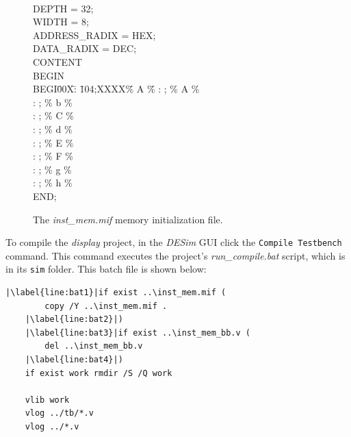 \documentclass[epsfig,10pt,fullpage]{article} \addtolength{\textwidth}{1.5in}
\begin{document}
~\\
\begin{figure}[bh!]
\begin{center}
\begin{minipage}[t]{12.5 cm}
\begin{tabbing}
DEPTH = 32;\\
WIDTH = 8;\\
ADDRESS\_RADIX = HEX;\\
DATA\_RADIX = DEC;\\
CONTENT\\
BEGIN\\
BEGI\=00X\=: \=104;XXXX\=\% A \=\% \kill
{} \>: ;    \>\% A \>\%\\
 \>: ;    \>\% b \>\%\\
 \>: ;    \>\% C \>\%\\
 \>: ;   \>\% d \>\%\\
 \>: ;    \>\% E \>\%\\
 \>: ;    \>\% F \>\%\\
 \>: ;   \>\% g \>\%\\
 \>: ;   \>\% h \>\%\\
END;
\end{tabbing}
\end{minipage}
\end{center}
    \caption{The {\it inst\_mem.mif} memory initialization file.}
\label{fig:mif}
\end{figure}

\clearpage
\newpage
\noindent
To compile the {\it display} project, in the {\it DESim} GUI click the \texttt{Compile Testbench}
command. This command executes the project's {\it run\_compile.bat} script, which
is in its \texttt{sim} folder. This batch file is shown below:

\begin{center}
\begin{minipage}[h]{12.5 cm}
\lstset{language=command.com,numbers=left,escapechar=|}
\begin{lstlisting}[]
    |\label{line:bat1}|if exist ..\inst_mem.mif (
        copy /Y ..\inst_mem.mif .
    |\label{line:bat2}|)
    |\label{line:bat3}|if exist ..\inst_mem_bb.v (
        del ..\inst_mem_bb.v
    |\label{line:bat4}|)
    if exist work rmdir /S /Q work

    vlib work
    vlog ../tb/*.v
    vlog ../*.v
\end{lstlisting}
\end{minipage}
\end{center}
\end{document}
